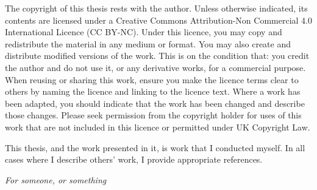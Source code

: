 \documentclass[a4paper, nobind]{templates/ociamthesis}
\begin{document}
\setcounter{secnumdepth}{2}
\setcounter{tocdepth}{1}



\begin{romanpages}

\maketitle

\begin{copyrights}
  The copyright of this thesis rests with the author. Unless otherwise indicated, its contents are licensed under a Creative Commons Attribution-Non Commercial 4.0 International Licence (CC BY-NC).
  Under this licence, you may copy and redistribute the material in any medium or format. You may also create and distribute modified versions of the work.
  This is on the condition that: you credit the author and do not use it, or any derivative works, for a commercial purpose.
  When reusing or sharing this work, ensure you make the licence terms clear to others by naming the licence and linking to the licence text.
  Where a work has been adapted, you should indicate that the work has been changed and describe those changes.
  Please seek permission from the copyright holder for uses of this work that are not included in this licence or permitted under UK Copyright Law.
\end{copyrights}

\begin{originality}
  This thesis, and the work presented in it, is work that I conducted myself.
  In all cases where I describe others' work, I provide appropriate references.
\end{originality}

\begin{dedication}
  \textit{For someone, or something}
\end{dedication}


\end{romanpages}
\end{document}
